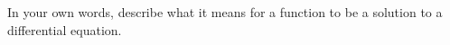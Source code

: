 In your own words, describe what it means for a function to be a solution to a differential equation.
